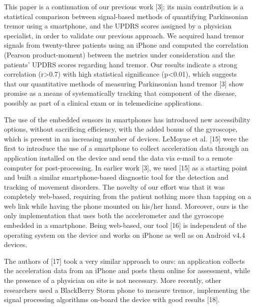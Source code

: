 This paper is a continuation of our previous work [3]; its main contribution is a statistical comparison between signal-based methods of quantifying Parkinsonian tremor using a smartphone, and the UPDRS scores assigned by a physician specialist, in order to validate our previous approach. We acquired hand tremor signals from twenty-three patients using an iPhone and computed the correlation (Pearson product-moment) between the metrics under consideration and the patients’ UPDRS scores regarding hand tremor. Our results indicate a strong correlation (r>0.7) with high statistical significance (p<0.01), which suggests that our quantitative methods of measuring Parkinsonian hand tremor [3] show promise as a means of systematically tracking that component of the disease, possibly as part of a clinical exam or in telemedicine applications. 

The use of the embedded sensors in smartphones has introduced new accessibility options, without sacrificing efficiency, with the added bonus of the gyroscope, which is present in an increasing number of devices. LeMoyne et al. [15] were the first to introduce the use of a smartphone to collect acceleration data through an application installed on the device and send the data via e-mail to a remote computer for post-processing. 
In earlier work [3], we used [15] as a starting point and built a similar smartphone-based diagnostic tool for the detection and tracking of movement disorders. The novelty of our effort was that it was completely web-based, requiring from the patient nothing more than tapping on a web link while having the phone mounted on his/her hand. Moreover, ours is the only implementation that uses both the accelerometer and the gyroscope embedded in a smartphone. Being web-based, our tool [16] is independent of the operating system on the device and works on iPhone as well as on Android v4.4 devices. 

The authors of [17] took a very similar approach to ours: an application collects the acceleration data from an iPhone and posts them online for assessment, while the presence of a physician on site is not necessary. More recently, other researchers used a BlackBerry Storm phone to measure tremor, implementing the signal processing algorithms on-board the device with good results [18]. 


